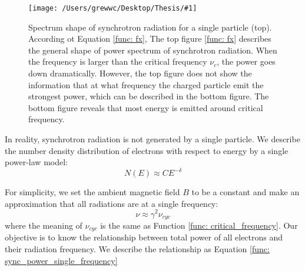 \documentclass[12pt]{report}
\newcommand{\singleFig}[3]{
  \begin{figure}[!htp]
    \centering
    \texttt{[image: /Users/grewwc/Desktop/Thesis/\#1]}
    \caption{#3}
    \label{fig: #1}
  \end{figure}
}
\begin{document}
            \singleFig{sync_spectrum_loglog_combined}{0.5}{Spectrum shape of synchrotron 
            radiation for a single particle (top). According ot Equation \ref{func: fx},
            The top figure \ref{func: fx} describes the general shape of power spectrum of 
            synchrotron radiation. When the frequency is larger than
            the critical frequency $\nu_c$, the power goes down dramatically. However, the 
            top figure does not show the information that at what frequency the charged 
            particle emit the strongest power, which can be described in the bottom figure. 
            The bottom figure reveals that most energy is emitted around critical frequency.}
  
            In reality, synchrotron radiation is not generated by a single particle. We 
            describe the number density distribution of electrons with respect to energy by a 
            single power-law model:
            \begin{equation}
              \label{func: sync_number_density}
              N\left(E\right) \approx C E^{-\delta}
            \end{equation}
          
            For simplicity, we set the ambient magnetic field $B$ to be a constant and make an 
            approximation that all radiations are at a single frequency:
            \begin{equation}
              \label{func: sync_approximation}
              \nu \approx \gamma^2 \nu_{cyc}
            \end{equation}
            where the meaning of $\nu_{cyc}$ is the same as Function 
            \ref{func: critical_frequency}. Our objective is to know the relationship between 
            total power of all electrons and their radiation frequency. We describe the 
            relationship as Equation \ref{func: sync_power_single_frequency}
            
\end{document}
